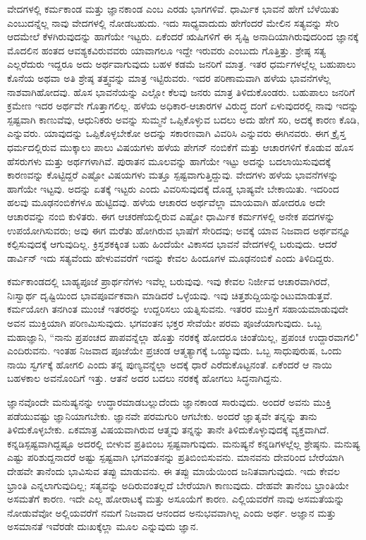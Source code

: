 ವೇದಗಳಲ್ಲಿ ಕರ್ಮಕಾಂಡ ಮತ್ತು ಜ್ಞಾನಕಾಂಡ ಎಂಬ ಎರಡು ಭಾಗಗಳಿವೆ. ಧಾರ್ಮಿಕ ಭಾವನೆ ಹೇಗೆ ಬೆಳೆಯಿತು ಎಂಬುದನ್ನೆಲ್ಲ ನಾವು ವೇದಗಳಲ್ಲಿ ನೋಡಬಹುದು. ಇದು ಸಾಧ್ಯವಾದುದು ಹೇಗೆಂದರೆ ಮೇಲಿನ ಸತ್ಯವನ್ನು ಸೇರಿ ಆದಮೇಲೆ ಕೆಳಗಿರುವುದನ್ನು ಹಾಗೆಯೇ ಇಟ್ಟರು. ಏಕೆಂದರೆ ಋಷಿಗಳಿಗೆ ಈ ಸೃಷ್ಟಿ ಅನಾದಿಯಾಗಿರುವುದರಿಂದ ಜ್ಞಾನಕ್ಕೆ ಮೊದಲಿನ ಹಂತದ ಆವಶ್ಯಕವಿರುವವರು ಯಾವಾಗಲೂ ಇದ್ದೇ ಇರುವರು ಎಂಬುದು ಗೊತ್ತಿತ್ತು. ಶ್ರೇಷ್ಠ ಸತ್ಯ ಎಲ್ಲರೆದುರು ಇದ್ದರೂ ಅದು ಅರ್ಥವಾಗುವುದು ಬಹಳ ಕಡಮೆ ಜನರಿಗೆ ಮಾತ್ರ. ಇತರ ಧರ್ಮಗಳಲ್ಲೆಲ್ಲ ಬಹುಪಾಲು ಕೊನೆಯ ಅಥವಾ ಅತಿ ಶ್ರೇಷ್ಠ ತತ್ತ್ವವನ್ನು ಮಾತ್ರ ಇಟ್ಟಿರುವರು. ಇದರ ಪರಿಣಾಮವಾಗಿ ಹಳೆಯ ಭಾವನೆಗಳೆಲ್ಲ ನಾಶವಾಗಿಹೋದವು. ಹೊಸ ಭಾವನೆಯನ್ನು ಎಲ್ಲೋ ಕೆಲವು ಜನರು ಮಾತ್ರ ತಿಳಿದುಕೊಂಡರು. ಬಹುಪಾಲು ಜನರಿಗೆ ಕ್ರಮೇಣ ಇದರ ಅರ್ಥವೇ ಗೊತ್ತಾಗಲಿಲ್ಲ. ಹಳೆಯ ಅಧಿಕಾರ-ಆಚಾರಗಳ ವಿರುದ್ಧ ದಂಗೆ ಏಳುವುದರಲ್ಲಿ ನಾವು ಇದನ್ನು ಸ್ಪಷ್ಟವಾಗಿ ಕಾಣುವೆವು, ಆಧುನಿಕರು ಅವನ್ನು ಸುಮ್ಮನೆ ಒಪ್ಪಿಕೊಳ್ಳುವ ಬದಲು ಅದು ಹೇಗೆ ಸರಿ, ಅದಕ್ಕೆ ಕಾರಣ ಕೊಡಿ, ಎನ್ನುವರು. ಯಾವುದನ್ನು ಒಪ್ಪಿಕೊಳ್ಳಬೇಕೋ ಅದನ್ನು ಸಕಾರಣವಾಗಿ ವಿವರಿಸಿ ಎನ್ನುವರು ಈಗಿನವರು. ಈಗ ಕ್ರೈಸ್ತ ಧರ್ಮದಲ್ಲಿರುವ ಮುಕ್ಕಾಲು ಪಾಲು ವಿಷಯಗಳು ಹಳೆಯ ಪೇಗನ್ ನಂಬಿಕೆಗೆ ಮತ್ತು ಆಚಾರಗಳಿಗೆ ಕೊಡುವ ಹೊಸ ಹೆಸರುಗಳು ಮತ್ತು ಅರ್ಥಗಳಾಗಿವೆ. ಪುರಾತನ ಮೂಲವನ್ನು ಹಾಗೆಯೇ ಇಟ್ಟು ಅದನ್ನು ಬದಲಾಯಿಸುವುದಕ್ಕೆ ಕಾರಣವನ್ನು ಕೊಟ್ಟಿದ್ದರೆ ಎಷ್ಟೋ ವಿಷಯಗಳು ಮತ್ತೂ ಸ್ಪಷ್ಟವಾಗುತ್ತಿದ್ದುವು. ವೇದಗಳು ಹಳೆಯ ಭಾವನೆಗಳನ್ನು ಹಾಗೆಯೇ ಇಟ್ಟವು. ಅದನ್ನು ಏತಕ್ಕೆ ಇಟ್ಟರು ಎಂದು ವಿವರಿಸುವುದಕ್ಕೆ ದೊಡ್ಡ ಭಾಷ್ಯವೇ ಬೇಕಾಯಿತು. ಇದರಿಂದ ಹಲವು ಮೂಢನಂಬಿಕೆಗಳೂ ಹುಟ್ಟಿದವು. ಹಳೆಯ ಆಚಾರದ ಅರ್ಥವೆಲ್ಲಾ ಮಾಯವಾಗಿ ಹೋದರೂ ಅದೇ ಆಚಾರವನ್ನು ನಂಬಿ ಕುಳಿತರು. ಈಗ ಆಚರಣೆಯಲ್ಲಿರುವ ಎಷ್ಟೋ ಧಾರ್ಮಿಕ ಕರ್ಮಗಳಲ್ಲಿ ಅನೇಕ ಪದಗಳನ್ನು ಉಪಯೋಗಿಸುವರು; ಅವು ಈಗ ಮರೆತು ಹೋಗಿರುವ ಭಾಷೆಗೆ ಸೇರಿದವು; ಅವಕ್ಕೆ ಯಾವ ನಿಜವಾದ ಅರ್ಥವನ್ನೂ ಕಲ್ಪಿಸುವುದಕ್ಕೆ ಆಗುವುದಿಲ್ಲ. ಕ್ರಿಸ್ತಶಕಕ್ಕಿಂತ ಬಹು ಹಿಂದೆಯೇ ವಿಕಾಸದ ಭಾವನೆ ವೇದಗಳಲ್ಲಿ ಬರುವುದು. ಆದರೆ ಡಾರ್ವಿನ್ ಇದು ಸತ್ಯವೆಂದು ಹೇಳುವವರೆಗೆ ಇದನ್ನು ಕೇವಲ ಹಿಂದೂಗಳ ಮೂಢನಂಬಿಕೆ ಎಂದು ತಿಳಿದಿದ್ದರು.

ಕರ್ಮಕಾಂಡದಲ್ಲಿ ಬಾಹ್ಯಪೂಜೆ ಪ್ರಾರ್ಥನೆಗಳು ಇವೆಲ್ಲ ಬರುವುವು. ಇವು ಕೇವಲ ನಿರ್ಜೀವ ಆಚಾರವಾಗಿರದೆ, ನಿಃಸ್ವಾರ್ಥ ದೃಷ್ಟಿಯಿಂದ ಭಾವಪೂರ್ವಕವಾಗಿ ಮಾಡಿದರೆ ಒಳ್ಳೆಯವು. ಇವು ಚಿತ್ತಶುದ್ದಿಯನ್ನುಂಟುಮಾಡುತ್ತವೆ. ಕರ್ಮಯೋಗಿ ತನಗಿಂತ ಮುಂಚೆ ಇತರರನ್ನು ಉದ್ದರಿಸಲು ಯತ್ನಿಸುವನು. ಇತರರ ಮುಕ್ತಿಗೆ ಸಹಾಯಮಾಡುವುದೇ ಅವನ ಮುಕ್ತಿಯಾಗಿ ಪರಿಣಮಿಸುವುದು. ಭಗವಂತನ ಭಕ್ತರ ಸೇವೆಯೇ ಪರಮ ಪೂಜೆಯಾಗುವುದು. ಒಬ್ಬ ಮಹಾಜ್ಞಾನಿ, “ನಾನು ಪ್ರಪಂಚದ ಪಾಪವನ್ನೆಲ್ಲಾ ಹೊತ್ತು ನರಕಕ್ಕೆ ಹೋದರೂ ಚಿಂತೆಯಿಲ್ಲ, ಪ್ರಪಂಚ ಉದ್ದಾರವಾಗಲಿ" ಎಂದಿರುವನು. ಇಂತಹ ನಿಜವಾದ ಪೂಜೆಯೇ ಪ್ರಚಂಡ ಆತ್ಮತ್ಯಾಗಕ್ಕೆ ಒಯ್ಯುವುದು. ಒಬ್ಬ ಸಾಧುಪುರುಷ, ಒಂದು ನಾಯಿ ಸ್ವರ್ಗಕ್ಕೆ ಹೋಗಲಿ ಎಂದು ತನ್ನ ಪುಣ್ಯವನ್ನೆಲ್ಲಾ ಅದಕ್ಕೆ ಧಾರೆ ಎರೆದುಕೊಟ್ಟನಂತೆ. ಏಕೆಂದರೆ ಆ ನಾಯಿ ಬಹಳಕಾಲ ಅವನೊಂದಿಗೆ ಇತ್ತು. ಆತನೆ ಅದರ ಬದಲು ನರಕಕ್ಕೆ ಹೋಗಲು ಸಿದ್ಧನಾಗಿದ್ದನು.

ಜ್ಞಾನವೊಂದೇ ಮನುಷ್ಯನನ್ನು ಉದ್ಧಾರಮಾಡಬಲ್ಲುದೆಂದು ಜ್ಞಾನಕಾಂಡ ಸಾರುವುದು. ಅಂದರೆ ಅವನು ಮುಕ್ತಿ ಪಡೆಯುವಷ್ಟು ಜ್ಞಾನಿಯಾಗಬೇಕು. ಜ್ಞಾನವೇ ಪರಮಗುರಿ ಆಗಬೇಕು. ಅಂದರೆ ಜ್ಞಾತೃವೇ ತನ್ನನ್ನು ತಾನು ತಿಳಿದುಕೊಳ್ಳಬೇಕು. ಏಕಮಾತ್ರ ವಿಷಯವಾಗಿರುವ ಆತ್ಮವು ತನ್ನನ್ನು ತಾನೇ ತಿಳಿದುಕೊಳ್ಳುವುದಕ್ಕೆ ವ್ಯಕ್ತವಾಗಿದೆ. ಕನ್ನಡಿ\break ಸ್ಪಷ್ಟವಾಗಿದ್ದಷ್ಟೂ ಅದರಲ್ಲಿ ಬೀಳುವ ಪ್ರತಿಬಿಂಬ ಸ್ಪಷ್ಟವಾಗುವುದು. ಮನುಷ್ಯನೆ ಕನ್ನಡಿಗಳಲ್ಲೆಲ್ಲ ಶ್ರೇಷ್ಠನು. ಮನುಷ್ಯ ಎಷ್ಟು ಪರಿಶುದ್ದನಾದರೆ ಅಷ್ಟು ಸ್ಪಷ್ಟವಾಗಿ ಭಗವಂತನನ್ನು ಪ್ರತಿಬಿಂಬಿಸುವನು. ಮಾನವನು ದೇವರಿಂದ ಬೇರೆಯಾಗಿ ದೇಹವೇ ತಾನೆಂದು ಭಾವಿಸುವ ತಪ್ಪು ಮಾಡುವನು. ಈ ತಪ್ಪು ಮಾಯೆಯಿಂದ ಜನಿತವಾಗುವುದು. ಇದು ಕೇವಲ ಭ್ರಾಂತಿ ಎನ್ನಲಾಗುವುದಿಲ್ಲ; ಸತ್ಯವನ್ನು ಅದಿರುವಂತಲ್ಲದೆ ಬೇರೆಯಾಗಿ ಕಾಣುವುದು. ದೇಹವೇ ತಾನೆಂಬ ಭ್ರಾಂತಿಯೇ ಅಸಮತೆಗೆ ಕಾರಣ. ಇದೇ ಎಲ್ಲ ಹೋರಾಟಕ್ಕೆ ಮತ್ತು ಅಸೂಯೆಗೆ ಕಾರಣ. ಎಲ್ಲಿಯವರೆಗೆ ನಾವು ಅಸಮತೆಯನ್ನು ನೋಡುವೆವೋ ಅಲ್ಲಿಯವರೆಗೆ ನಮಗೆ ನಿಜವಾದ ಆನಂದದ ಅನುಭವವಾಗಿಲ್ಲ ಎಂದು ಅರ್ಥ. ಅಜ್ಞಾನ ಮತ್ತು ಅಸಮಾನತೆ ಇವೆರಡೇ ದುಃಖಕ್ಕೆಲ್ಲಾ ಮೂಲ ಎನ್ನುವುದು ಜ್ಞಾನ.

